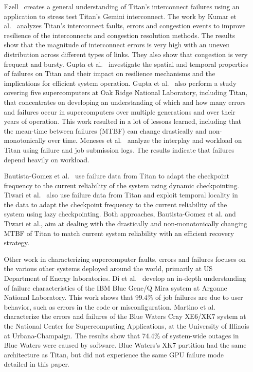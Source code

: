Ezell~\cite{osti_1086655} creates a general understanding of Titan's interconnect failures using an application to stress test Titan's Gemini interconnect.
%
The work by Kumar et al.~\cite{kumar18understanding} analyzes Titan's interconnect faults, errors and congestion events to improve resilience of the interconnects and congestion resolution methods. The results show that the magnitude of interconnect errors is very high with an uneven distribution across different types of links. They also show that congestion is very frequent and bursty.
%
Gupta et al.~\cite{7266836} investigate the spatial and temporal properties of failures on Titan and their impact on resilience mechanisms and the implications for efficient system operation.
%
Gupta et al.~\cite{gupta17failures} also perform a study covering five supercomputers at Oak Ridge National Laboratory, including Titan, that concentrates on developing an understanding of which and how many errors and failures occur in supercomputers over multiple generations and over their years of operation. This work resulted in a lot of lessons learned, including that the mean-time between failures (MTBF) can change drastically and non-monotonically over time.
%
Meneses et al.~\cite{Meneses15Analyzing} analyze the interplay and workload on Titan using failure and job submission logs. The results indicate that failures depend heavily on workload.

Bautista-Gomez et al.~\cite{bautista-gomez16reducing} use failure data from Titan to adapt the checkpoint frequency to the current reliability of the system using dynamic checkpointing.
%
Tiwari et al.~\cite{6903564} also use failure data from Titan and exploit temporal locality in the data to adapt the checkpoint frequency to the current reliability of the system using lazy checkpointing.
%
Both approaches, Bautista-Gomez et al. and Tiwari et al., aim at dealing with the drastically and non-monotonically changing MTBF of Titan to match current system reliability with an efficient recovery strategy.

Other work in characterizing supercomputer faults, errors and failures focuses on the various other systems deployed around the world, primarily at US Department of Energy laboratories.
%
Di et al.~\cite{8809553} develop an in-depth understanding of failure characteristics of the IBM Blue Gene/Q Mira system at Argonne National Laboratory. This work shows that 99.4\% of job failures are due to user behavior, such as errors in the code or misconfiguration. Martino et al.~\cite{6903615} characterize the errors and failures of the Blue Waters Cray XE6/XK7 system at the National Center for Supercomputing Applications, at the University of Illinois at Urbana-Champaign. The results show that 74.4\% of system-wide outages in Blue Waters were caused by software. Blue Waters's XK7 partition had the same architecture as Titan, but did not experience the same GPU failure mode detailed in this paper.
